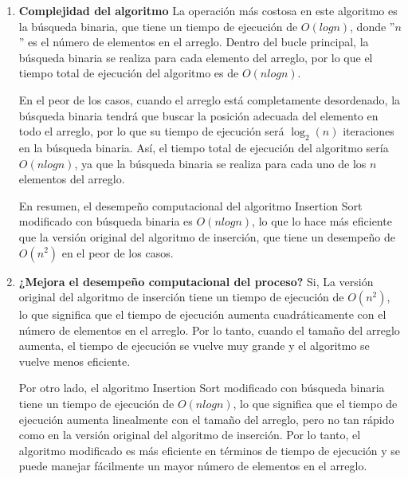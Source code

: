 \begin{enumerate}
    \item \textbf{Complejidad del algoritmo} La operación más costosa en este algoritmo es la búsqueda binaria, que tiene un tiempo de ejecución de $O(log n)$, donde ''$n$'' es el número de elementos en el arreglo. Dentro del bucle principal, la búsqueda binaria se realiza para cada elemento del arreglo, por lo que el tiempo total de ejecución del algoritmo es de $O(n log n)$.

        En el peor de los casos, cuando el arreglo está completamente desordenado, la búsqueda binaria tendrá que buscar la posición adecuada del elemento en todo el arreglo, por lo que su tiempo de ejecución será $\log_2(n)$ iteraciones en la búsqueda binaria. Así, el tiempo total de ejecución del algoritmo sería $O(n log n)$, ya que la búsqueda binaria se realiza para cada uno de los $n$ elementos del arreglo.

        En resumen, el desempeño computacional del algoritmo Insertion Sort modificado con búsqueda binaria es $O(n log n)$, lo que lo hace más eficiente que la versión original del algoritmo de inserción, que tiene un desempeño de $O(n^2)$ en el peor de los casos.
    \item \textbf{¿Mejora el desempeño computacional del proceso?} Si, La versión original del algoritmo de inserción tiene un tiempo de ejecución de $O(n^2)$, lo que significa que el tiempo de ejecución aumenta cuadráticamente con el número de elementos en el arreglo. Por lo tanto, cuando el tamaño del arreglo aumenta, el tiempo de ejecución se vuelve muy grande y el algoritmo se vuelve menos eficiente.

        Por otro lado, el algoritmo Insertion Sort modificado con búsqueda binaria tiene un tiempo de ejecución de $O(n log n)$, lo que significa que el tiempo de ejecución aumenta linealmente con el tamaño del arreglo, pero no tan rápido como en la versión original del algoritmo de inserción. Por lo tanto, el algoritmo modificado es más eficiente en términos de tiempo de ejecución y se puede manejar fácilmente un mayor número de elementos en el arreglo.

\end{enumerate}


